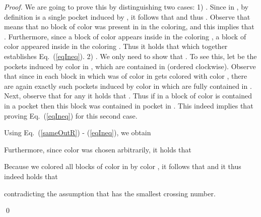 \documentclass{llncs}
\begin{document}
\begin{proof}
We are going to prove this by distinguishing two cases:
1) . Since in , by definition  is a single pocket induced by , it follows that  and thus  . Observe that  means that no block of color  was present in  in the  coloring, and this implies that . Furthermore, since a block of color  appears inside  in the coloring , a block of color  appeared inside  in the coloring . Thus it holds that   which together establishes Eq.~(\ref{eqIneq}). 2) . We only need to show that  . To see this, let  be the pockets induced by color  in , which are contained in  (ordered clockwise).  Observe that since in  each block in  which was of color  in  gets colored with color , there are again exactly  such pockets   induced by color  in  which are fully contained in . Next, observe that for any  it holds that . Thus if in  a block of color  is contained in a pocket  then this block was contained in pocket  in . This indeed implies that  proving Eq.~(\ref{eqIneq}) for this second case.


Using Eq.~(\ref{sameOutR}) - (\ref{eqIneq}), we obtain




Furthermore, since color  was chosen arbitrarily, it holds that


Because we colored all blocks of color  in  by color , it follows that  and it thus indeed holds that 
 
contradicting the assumption that  has the smallest crossing number.





\qed


\end{proof}
\end{document}
